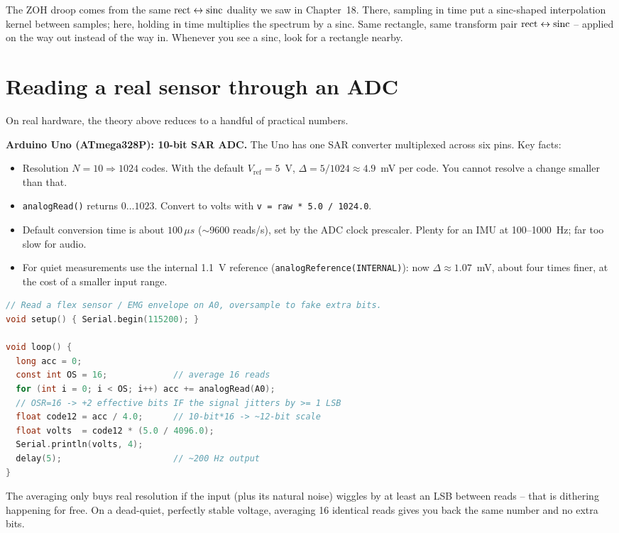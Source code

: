 \begin{connectionbox}
The ZOH droop comes from the same $\operatorname{rect} \leftrightarrow \operatorname{sinc}$ duality we saw in Chapter~18. There, sampling in time put
a sinc-shaped interpolation kernel between samples; here, holding in time multiplies the spectrum
by a sinc. Same rectangle, same transform pair $\operatorname{rect} \leftrightarrow \operatorname{sinc}$ -- applied on
the way out instead of the way in. Whenever you see a sinc, look for a rectangle nearby.
\end{connectionbox}

\section{Reading a real sensor through an ADC}
\label{ch19:bench}

On real hardware, the theory above reduces to a handful of practical numbers.

\begin{buildbox}
\textbf{Arduino Uno (ATmega328P): 10-bit SAR ADC.} The Uno has one SAR converter multiplexed
across six pins. Key facts:
\begin{itemize}
  \item Resolution $N=10 \Rightarrow 1024$ codes. With the default $V_{\mathrm{ref}}=5$~V,
        $\Delta = 5/1024 \approx 4.9$~mV per code. You cannot resolve a change smaller than that.
  \item \texttt{analogRead()} returns $0\ldots1023$. Convert to volts with
        \texttt{v = raw * 5.0 / 1024.0}.
  \item Default conversion time is about $100\,\mu s$ ($\sim$9600 reads/s), set by the ADC clock
        prescaler. Plenty for an IMU at 100--1000~Hz; far too slow for audio.
  \item For quiet measurements use the internal 1.1~V reference (\texttt{analogReference(INTERNAL)}):
        now $\Delta \approx 1.07$~mV, about four times finer, at the cost of a smaller input range.
\end{itemize}
\begin{lstlisting}[language=C]
// Read a flex sensor / EMG envelope on A0, oversample to fake extra bits.
void setup() { Serial.begin(115200); }

void loop() {
  long acc = 0;
  const int OS = 16;             // average 16 reads
  for (int i = 0; i < OS; i++) acc += analogRead(A0);
  // OSR=16 -> +2 effective bits IF the signal jitters by >= 1 LSB
  float code12 = acc / 4.0;      // 10-bit*16 -> ~12-bit scale
  float volts  = code12 * (5.0 / 4096.0);
  Serial.println(volts, 4);
  delay(5);                      // ~200 Hz output
}
\end{lstlisting}
The averaging only buys real resolution if the input (plus its natural noise) wiggles by at least
an LSB between reads -- that is dithering happening for free. On a dead-quiet, perfectly stable
voltage, averaging 16 identical reads gives you back the same number and no extra bits.
\end{buildbox}

